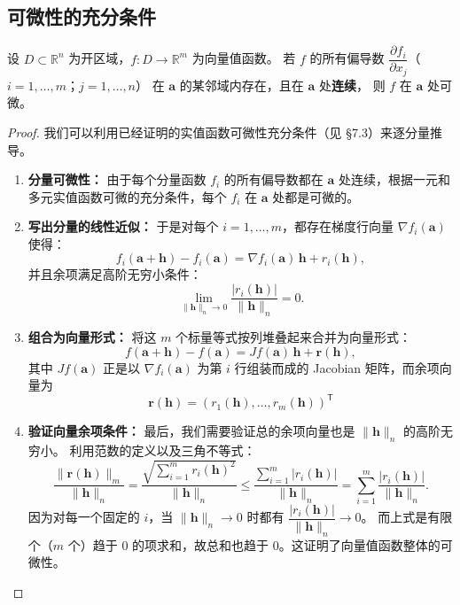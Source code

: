 \documentclass[lang=cn,11pt]{elegantbook}
\begin{document}
\subsection{可微性的充分条件}

\begin{theorem}[向量值函数可微的充分条件] \label{thm:vec-diff-sufficient}
设 $D\subset\mathbb R^n$ 为开区域，$f:D\to\mathbb R^m$ 为向量值函数。
若 $f$ 的所有偏导数 $\dfrac{\partial f_i}{\partial x_j}$（$i=1,\dots,m$；$j=1,\dots,n$）
在 $\boldsymbol a$ 的某邻域内存在，且在 $\boldsymbol a$ 处\textbf{连续}，
则 $f$ 在 $\boldsymbol a$ 处可微。
\end{theorem}

\begin{proof}
我们可以利用已经证明的实值函数可微性充分条件（见 §7.3）来逐分量推导。

\begin{enumerate}
  \item \textbf{分量可微性：}
  由于每个分量函数 $f_i$ 的所有偏导数都在 $\boldsymbol a$ 处连续，根据一元和多元实值函数可微的充分条件，每个 $f_i$ 在 $\boldsymbol a$ 处都是可微的。

  \item \textbf{写出分量的线性近似：}
  于是对每个 $i=1,\dots,m$，都存在梯度行向量 $\nabla f_i(\boldsymbol a)$ 使得：
  \[
  f_i(\boldsymbol a+\boldsymbol h)-f_i(\boldsymbol a)
  =\nabla f_i(\boldsymbol a)\,\boldsymbol h+r_i(\boldsymbol h),
  \]
  并且余项满足高阶无穷小条件：
  \[
  \lim_{\|\boldsymbol h\|_n\to 0}\frac{|r_i(\boldsymbol h)|}{\|\boldsymbol h\|_n}=0.
  \]

  \item \textbf{组合为向量形式：}
  将这 $m$ 个标量等式按列堆叠起来合并为向量形式：
  \[
  f(\boldsymbol a+\boldsymbol h)-f(\boldsymbol a)
  =Jf(\boldsymbol a)\,\boldsymbol h+\boldsymbol r(\boldsymbol h),
  \]
  其中 $Jf(\boldsymbol a)$ 正是以 $\nabla f_i(\boldsymbol a)$ 为第 $i$ 行组装而成的 Jacobian 矩阵，而余项向量为 \[\boldsymbol r(\boldsymbol h)=(r_1(\boldsymbol h),\dots,r_m(\boldsymbol h))^{\mathsf T}\]

  \item \textbf{验证向量余项条件：}
  最后，我们需要验证总的余项向量也是 $\|\boldsymbol h\|_n$ 的高阶无穷小。
  利用范数的定义以及三角不等式：
  \[
  \frac{\|\boldsymbol r(\boldsymbol h)\|_m}{\|\boldsymbol h\|_n}
  =\frac{\sqrt{\sum_{i=1}^m r_i(\boldsymbol h)^2}}{\|\boldsymbol h\|_n}
  \leqslant  \frac{\sum_{i=1}^m |r_i(\boldsymbol h)|}{\|\boldsymbol h\|_n}
  =\sum_{i=1}^m\frac{|r_i(\boldsymbol h)|}{\|\boldsymbol h\|_n}.
  \]
  因为对每一个固定的 $i$，当 $\|\boldsymbol h\|_n \to 0$ 时都有 $\dfrac{|r_i(\boldsymbol h)|}{\|\boldsymbol h\|_n} \to 0$。
  而上式是有限个（$m$ 个）趋于 $0$ 的项求和，故总和也趋于 $0$。这证明了向量值函数整体的可微性。
\end{enumerate}
\end{proof}
\end{document}
